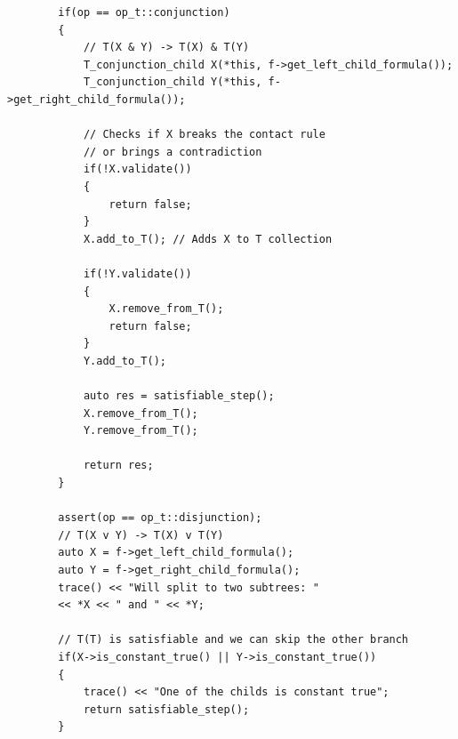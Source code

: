 \documentclass{article}
\begin{document}
\begin{lstlisting}
        if(op == op_t::conjunction)
        {
            // T(X & Y) -> T(X) & T(Y)
            T_conjunction_child X(*this, f->get_left_child_formula());
            T_conjunction_child Y(*this, f->get_right_child_formula());

            // Checks if X breaks the contact rule
            // or brings a contradiction
            if(!X.validate())
            {
                return false;
            }
            X.add_to_T(); // Adds X to T collection

            if(!Y.validate())
            {
                X.remove_from_T();
                return false;
            }
            Y.add_to_T();

            auto res = satisfiable_step();
            X.remove_from_T();
            Y.remove_from_T();

            return res;
        }

        assert(op == op_t::disjunction);
        // T(X v Y) -> T(X) v T(Y)
        auto X = f->get_left_child_formula();
        auto Y = f->get_right_child_formula();
        trace() << "Will split to two subtrees: "
		<< *X << " and " << *Y;

        // T(T) is satisfiable and we can skip the other branch
        if(X->is_constant_true() || Y->is_constant_true())
        {
            trace() << "One of the childs is constant true";
            return satisfiable_step();
        }
\end{lstlisting}
\newpage
\end{document}
